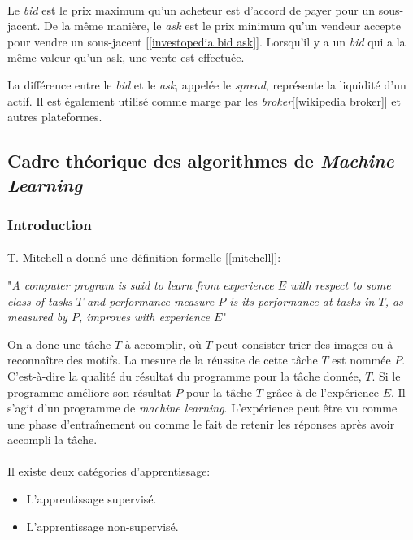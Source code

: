 \documentclass[a4paper, 11pt]{article}
\begin{document}
\paragraph{}
Le \textit{bid} est le prix maximum qu'un acheteur est d'accord de payer pour un sous-jacent.
De la même manière, le \textit{ask} est le prix minimum qu'un vendeur accepte pour vendre un sous-jacent [\ref{investopedia bid ask}].
Lorsqu'il y a un \textit{bid} qui a la même valeur qu'un {ask}, une vente est effectuée. 

La différence entre le \textit{bid} et le \textit{ask}, appelée le \textit{spread}, représente la liquidité d'un actif. Il est également utilisé comme marge par les \textit{broker}[\ref{wikipedia broker}] et autres plateformes.



\subsection{Cadre théorique des algorithmes de \textit{Machine Learning}}
\subsubsection{Introduction}
\paragraph{}
T. Mitchell a donné une définition formelle [\ref{mitchell}]:
\begin{center}
"\textit{A computer program is said to learn from experience $E$ with respect to some class of tasks $T$ and performance measure $P$ is its performance at tasks in $T$, as measured by $P$, improves with experience $E$}"
\end{center}

On a donc une tâche $T$ à accomplir, où $T$ peut consister trier des images ou à reconnaître des motifs. La mesure de la réussite de cette tâche $T$ est nommée $P$. C'est-à-dire la qualité du résultat du programme pour la tâche donnée, $T$. Si le programme améliore son résultat $P$ pour la tâche $T$ grâce à de l'expérience $E$. Il s'agit d'un programme de \textit{machine learning}. L'expérience peut être vu comme une phase d'entraînement ou comme le fait de retenir les réponses après avoir accompli la tâche.

\paragraph{}
Il existe deux catégories d'apprentissage:
\begin{itemize}
\item L'apprentissage supervisé.
\item L'apprentissage non-supervisé.
\end{itemize}
\end{document}
